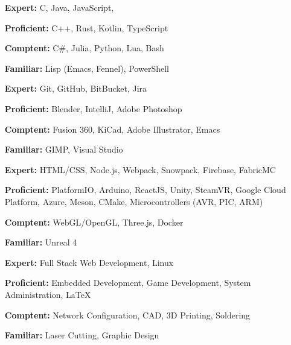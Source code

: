 \documentclass[9pt]{developercv} %
\begin{document}
\begin{minipage}[t]{0.45\textwidth}
	\begin{itemize}
		\item[\textbf{Expert:}] C, Java, JavaScript,
		\item[\textbf{Proficient:}] C++, Rust, Kotlin, TypeScript
		\item[\textbf{Comptent:}] C\#, Julia, Python, Lua, Bash
		\item[\textbf{Familiar:}] Lisp (Emacs, Fennel), PowerShell
	\end{itemize}
\end{minipage}
\hfill
\begin{minipage}[t]{0.5\textwidth}
	\begin{itemize}
		\item[\textbf{Expert:}] Git, GitHub, BitBucket, Jira
		\item[\textbf{Proficient:}] Blender, IntelliJ, Adobe Photoshop
		\item[\textbf{Comptent:}] Fusion 360, KiCad, Adobe Illustrator, Emacs
		\item[\textbf{Familiar:}] GIMP, Visual Studio
	\end{itemize}
\end{minipage}

\vspace{1em}

\begin{minipage}[t]{0.45\textwidth}
	\begin{itemize}
		\item[\textbf{Expert:}] HTML/CSS, Node.js, Webpack, Snowpack, Firebase, FabricMC
		\item[\textbf{Proficient:}] PlatformIO, Arduino, ReactJS, Unity, SteamVR, Google Cloud Platform, Azure, Meson, CMake, Microcontrollers (AVR, PIC, ARM)
		\item[\textbf{Comptent:}] WebGL/OpenGL, Three.js, Docker
		\item[\textbf{Familiar:}] Unreal 4
	\end{itemize}
\end{minipage}
\hfill
\begin{minipage}[t]{0.5\textwidth} %
	\begin{itemize}
		\item[\textbf{Expert:}] Full Stack Web Development, Linux
		\item[\textbf{Proficient:}] Embedded Development, Game Development, System Administration, \LaTeX
		\item[\textbf{Comptent:}] Network Configuration, CAD, 3D Printing, Soldering
		\item[\textbf{Familiar:}] Laser Cutting, Graphic Design
	\end{itemize}
\end{minipage}
\end{document}
